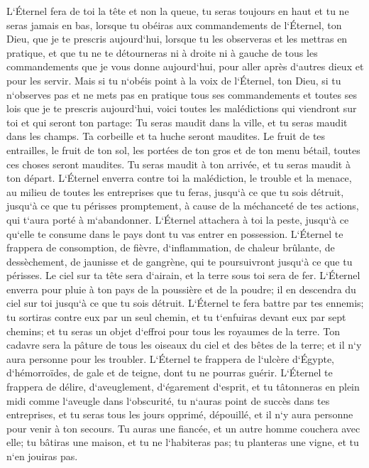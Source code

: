 \verse L`Éternel fera de toi la tête et non la queue, tu seras toujours en haut et tu ne seras jamais en bas, lorsque tu obéiras aux commandements de l`Éternel, ton Dieu, que je te prescris aujourd`hui, lorsque tu les observeras et les mettras en pratique, 
\verse et que tu ne te détourneras ni à droite ni à gauche de tous les commandements que je vous donne aujourd`hui, pour aller après d`autres dieux et pour les servir. 
\verse Mais si tu n`obéis point à la voix de l`Éternel, ton Dieu, si tu n`observes pas et ne mets pas en pratique tous ses commandements et toutes ses lois que je te prescris aujourd`hui, voici toutes les malédictions qui viendront sur toi et qui seront ton partage: 
\verse Tu seras maudit dans la ville, et tu seras maudit dans les champs. 
\verse Ta corbeille et ta huche seront maudites. 
\verse Le fruit de tes entrailles, le fruit de ton sol, les portées de ton gros et de ton menu bétail, toutes ces choses seront maudites. 
\verse Tu seras maudit à ton arrivée, et tu seras maudit à ton départ. 
\verse L`Éternel enverra contre toi la malédiction, le trouble et la menace, au milieu de toutes les entreprises que tu feras, jusqu`à ce que tu sois détruit, jusqu`à ce que tu périsses promptement, à cause de la méchanceté de tes actions, qui t`aura porté à m`abandonner. 
\verse L`Éternel attachera à toi la peste, jusqu`à ce qu`elle te consume dans le pays dont tu vas entrer en possession. 
\verse L`Éternel te frappera de consomption, de fièvre, d`inflammation, de chaleur brûlante, de dessèchement, de jaunisse et de gangrène, qui te poursuivront jusqu`à ce que tu périsses. 
\verse Le ciel sur ta tête sera d`airain, et la terre sous toi sera de fer. 
\verse L`Éternel enverra pour pluie à ton pays de la poussière et de la poudre; il en descendra du ciel sur toi jusqu`à ce que tu sois détruit. 
\verse L`Éternel te fera battre par tes ennemis; tu sortiras contre eux par un seul chemin, et tu t`enfuiras devant eux par sept chemins; et tu seras un objet d`effroi pour tous les royaumes de la terre. 
\verse Ton cadavre sera la pâture de tous les oiseaux du ciel et des bêtes de la terre; et il n`y aura personne pour les troubler. 
\verse L`Éternel te frappera de l`ulcère d`Égypte, d`hémorroïdes, de gale et de teigne, dont tu ne pourras guérir. 
\verse L`Éternel te frappera de délire, d`aveuglement, d`égarement d`esprit, 
\verse et tu tâtonneras en plein midi comme l`aveugle dans l`obscurité, tu n`auras point de succès dans tes entreprises, et tu seras tous les jours opprimé, dépouillé, et il n`y aura personne pour venir à ton secours. 
\verse Tu auras une fiancée, et un autre homme couchera avec elle; tu bâtiras une maison, et tu ne l`habiteras pas; tu planteras une vigne, et tu n`en jouiras pas. 

